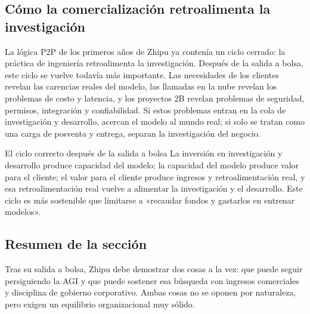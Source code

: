 \subsection{Cómo la comercialización retroalimenta la investigación}

La lógica P2P de los primeros años de Zhipu ya contenía un ciclo cerrado: la práctica de ingeniería retroalimenta la investigación. Después de la salida a bolsa, este ciclo se vuelve todavía más importante. Las necesidades de los clientes revelan las carencias reales del modelo, las llamadas en la nube revelan los problemas de costo y latencia, y los proyectos 2B revelan problemas de seguridad, permisos, integración y confiabilidad. Si estos problemas entran en la cola de investigación y desarrollo, acercan el modelo al mundo real; si solo se tratan como una carga de posventa y entrega, separan la investigación del negocio.

\begin{importantbox}{El ciclo correcto después de la salida a bolsa}
La inversión en investigación y desarrollo produce capacidad del modelo; la capacidad del modelo produce valor para el cliente; el valor para el cliente produce ingresos y retroalimentación real, y esa retroalimentación real vuelve a alimentar la investigación y el desarrollo. Este ciclo es más sostenible que limitarse a «recaudar fondos y gastarlos en entrenar modelos».
\end{importantbox}

\subsection{Resumen de la sección}

Tras su salida a bolsa, Zhipu debe demostrar dos cosas a la vez: que puede seguir persiguiendo la AGI y que puede sostener esa búsqueda con ingresos comerciales y disciplina de gobierno corporativo. Ambas cosas no se oponen por naturaleza, pero exigen un equilibrio organizacional muy sólido.
